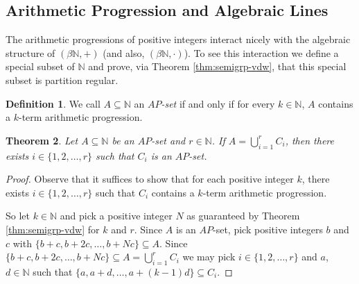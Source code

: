 \documentclass[12pt,showtrims]{memoir}
\theoremstyle{plain}
\newtheorem{thm}{Theorem}[section]
\theoremstyle{definition}
\newtheorem{defn}[thm]{Definition}
\newcommand{\bbN}{\mathbb{N}}
\begin{document}
\subsection{Arithmetic Progression and Algebraic Lines}
The arithmetic progressions of positive integers interact nicely with the algebraic structure of $(\beta \bbN, +)$ (and also, $(\beta \bbN, \cdot)$). 
To see this interaction we define a special subset of $\bbN$ and prove, via Theorem \ref{thm:semigrp-vdw}, that this special subset is partition regular.%

\begin{defn}
  We call $A \subseteq \bbN$ an \textsl{$AP$-set} if and only if for every $k \in \bbN$, $A$ contains a $k$-term arithmetic progression.
\end{defn}

\begin{thm}
  \label{thm:ap-partition-reg}
  Let $A \subseteq \bbN$ be an $AP$-set and $r \in \bbN$.
  If $A = \bigcup_{i=1}^r C_i$, then there exists $i \in \{1, 2, \ldots, r\}$ such that $C_i$ is an $AP$-set.
\end{thm}
\begin{proof}
  Observe that it suffices to show that for each positive integer $k$, there exists $i \in \{1, 2, \ldots, r\}$ such that $C_i$ contains a $k$-term arithmetic progression.

  So let $k \in \bbN$ and pick a positive integer $N$ as guaranteed by Theorem \ref{thm:semigrp-vdw} for $k$ and $r$.
  Since $A$ is an $AP$-set, pick positive integers $b$ and $c$ with $\{b+c, b+2c, \ldots, b+Nc\} \subseteq A$. 
  Since $\{b+c, b+2c, \ldots, b+Nc \} \subseteq A = \bigcup_{i=1}^r C_i$ we may pick $i \in \{1, 2, \ldots, r\}$ and $a$, $d \in \bbN$ such that $\{a, a+d, \ldots, a+(k-1)d\} \subseteq C_i$.
\end{proof}
\end{document}
